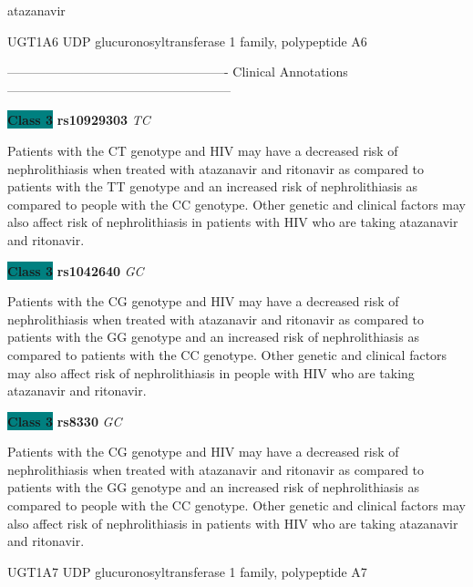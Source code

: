 \documentclass{resume} %
\begin{document}
\begin{rSection}{ atazanavir }
\begin{rSubsection}{ UGT1A6 }{ UDP glucuronosyltransferase 1 family, polypeptide A6 }{}{}
\item[] ---------------------------------------------------- Clinical Annotations -----------------------------------------------------\newline
\item \textbf{\colorbox{teal} {Class 3}} \textbf{ rs10929303 } \textit{ TC }
\item[] Patients with the CT genotype and HIV may have a decreased risk of nephrolithiasis when treated with atazanavir and ritonavir as compared to patients with the TT genotype and an increased risk of nephrolithiasis as compared to people with the CC genotype. Other genetic and clinical factors may also affect risk of nephrolithiasis in patients with HIV who are taking atazanavir and ritonavir. \item \textbf{\colorbox{teal} {Class 3}} \textbf{ rs1042640 } \textit{ GC }
\item[] Patients with the CG genotype and HIV may have a decreased risk of nephrolithiasis when treated with atazanavir and ritonavir as compared to patients with the GG genotype and an increased risk of nephrolithiasis as compared to patients with the CC genotype. Other genetic and clinical factors may also affect risk of nephrolithiasis in people with HIV who are taking atazanavir and ritonavir.\item \textbf{\colorbox{teal} {Class 3}} \textbf{ rs8330 } \textit{ GC }
\item[] Patients with the CG genotype and HIV may have a decreased risk of nephrolithiasis when treated with atazanavir and ritonavir as compared to patients with the GG genotype and an increased risk of nephrolithiasis as compared to people with the CC genotype. Other genetic and clinical factors may also affect risk of nephrolithiasis in patients with HIV who are taking atazanavir and ritonavir.
\end{rSubsection}\begin{rSubsection}{ UGT1A7 }{ UDP glucuronosyltransferase 1 family, polypeptide A7 }{}{}
\item[]


\end{rSubsection}
\end{rSection}
\end{document}
